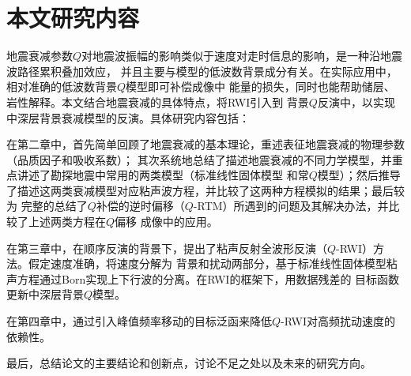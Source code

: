 \vspace{0.9cm}
\section{本文研究内容}
\vspace{0.5cm}

地震衰减参数$Q$对地震波振幅的影响类似于速度对走时信息的影响，是一种沿地震波路径累积叠加效应，
并且主要与模型的低波数背景成分有关。在实际应用中，相对准确的低波数背景$Q$模型即可补偿成像中
能量的损失，同时也能帮助储层、岩性解释。本文结合地震衰减的具体特点，将RWI引入到
背景$Q$反演中，以实现中深层背景衰减模型的反演。具体研究内容包括：

在第二章中，首先简单回顾了地震衰减的基本理论，重述表征地震衰减的物理参数（品质因子和吸收系数）；
其次系统地总结了描述地震衰减的不同力学模型，并重点讲述了勘探地震中常用的两类模型（标准线性固体模型
和常$Q$模型）；然后推导了描述这两类衰减模型对应粘声波方程，并比较了这两种方程模拟的结果；最后较为
完整的总结了$Q$补偿的逆时偏移（$Q$-RTM）所遇到的问题及其解决办法，并比较了上述两类方程在$Q$偏移
成像中的应用。

在第三章中，在顺序反演的背景下，提出了粘声反射全波形反演（$Q$-RWI）方法。假定速度准确，将速度分解为
背景和扰动两部分，基于标准线性固体模型粘声方程通过Born实现上下行波的分离。在RWI的框架下，用数据残差的
目标函数更新中深层背景$Q$模型。

在第四章中，通过引入峰值频率移动的目标泛函来降低$Q$-RWI对高频扰动速度的依赖性。

最后，总结论文的主要结论和创新点，讨论不足之处以及未来的研究方向。

















